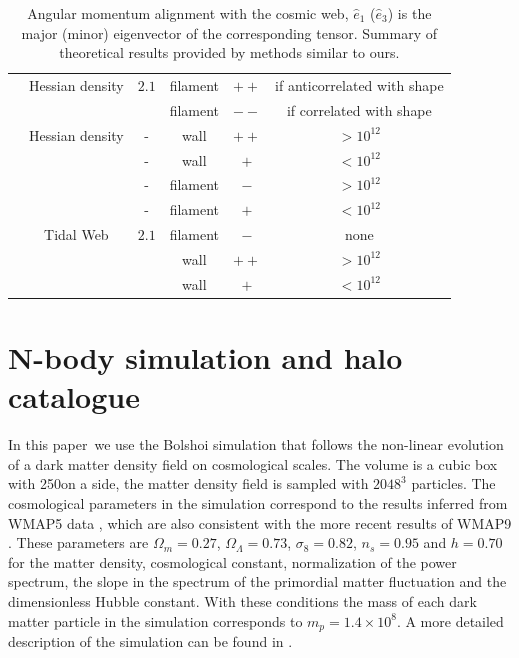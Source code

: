 \documentclass[useAMS,usenatbib]{mn2e}
\newcommand{\documentname}{paper~}
\newcommand{\hMpc}{{\ifmmode{h^{-1}{\rm Mpc}}\else{$h^{-1}$Mpc }\fi}}
\newcommand{\hMsun}{{\ifmmode{h^{-1}{\rm
        {M_{\odot}}}}\else{$h^{-1}{\rm{M_{\odot}}}$~}\fi}}
\begin{document}
\begin{table}
\begin{tabular}{cccccc}
\cite{Zhang2009}  & Hessian density &  $2.1$ &
filament & $++$ & if anticorrelated with shape\\

& &  &
filament & $--$ & if correlated with shape\\\hline

\cite{AragonCalvo2007} & Hessian density & - &
wall & $++$ & $>10^{12}$\hMsun\\


& & - &
wall & $+$ & $<10^{12}$\hMsun\\

& & - &
filament& $-$ & $>10^{12}$\hMsun\\


& & - &
filament& $+$ & $<10^{12}$\hMsun\\\hline



\cite{Hahn2007} & Tidal Web & $2.1$ & filament & $-$& none\\

& & &
wall & $++$ & $>10^{12}$\hMsun\\
& &    &
wall& $+$ & $<10^{12}$\hMsun\\\hline \hline


\end{tabular}
\caption{Angular momentum alignment with the cosmic web, 
$\hat{e}_1$ ($\hat{e}_3$)
is the major (minor) eigenvector of
the corresponding tensor. 
Summary of theoretical
  results provided by methods similar to ours.}

\end{table}



\section{N-body simulation and halo catalogue}
\label{sec:nbody}

In this \documentname we use the Bolshoi simulation that follows the
non-linear evolution of a dark matter density field on cosmological
scales. The volume is a cubic box with 250\hMpc on a side, the matter
density field is sampled with $2048^3$ particles. The 
cosmological parameters in the simulation correspond to the results
inferred from WMAP5 data \citep{2009ApJS..180..306D}, which are also consistent with the more
recent results of WMAP9 \citep{2013ApJS..208...19H}. These parameters are $\Omega_m=0.27$,
$\Omega_{\Lambda} =0.73$, $\sigma_8=0.82$, $n_s=0.95$ and $h=0.70$ for the
matter density, cosmological constant, normalization of the power
spectrum, the slope in the spectrum of the primordial matter
fluctuation and the dimensionless Hubble constant. With these
conditions the mass of each dark matter particle in the simulation
corresponds to $m_p=1.4\times 10^{8}$\hMsun. A more detailed
description of the simulation can be found in
\citep{2011ApJ...740..102K}.
\end{document}
